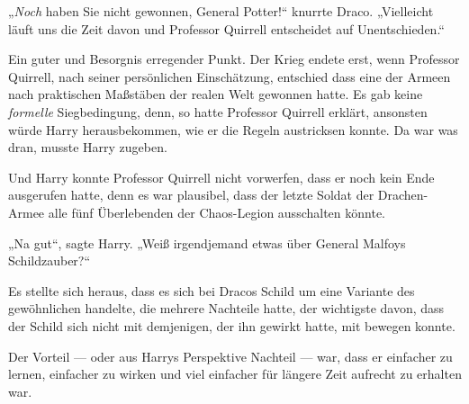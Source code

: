 „\emph{Noch} haben Sie nicht gewonnen, General Potter!“ knurrte Draco.
„Vielleicht läuft uns die Zeit davon und Professor Quirrell entscheidet auf Unentschieden.“

Ein guter und Besorgnis erregender Punkt. Der Krieg endete erst, wenn Professor Quirrell, nach seiner persönlichen Einschätzung, entschied dass eine der Armeen nach praktischen Maßstäben der realen Welt gewonnen hatte. Es gab keine \emph{formelle} Siegbedingung, denn, so hatte Professor Quirrell erklärt, ansonsten würde Harry herausbekommen, wie er die Regeln austricksen konnte. Da war was dran, musste Harry zugeben.

Und Harry konnte Professor Quirrell nicht vorwerfen, dass er noch kein Ende ausgerufen hatte, denn es war plausibel, dass der letzte Soldat der Drachen-Armee alle fünf Überlebenden der Chaos-Legion ausschalten könnte.

„Na gut“, sagte Harry.
„Weiß irgendjemand etwas über General Malfoys Schildzauber?“

Es stellte sich heraus, dass es sich bei Dracos Schild um eine Variante des gewöhnlichen  handelte, die mehrere Nachteile hatte, der wichtigste davon, dass der Schild sich nicht mit demjenigen, der ihn gewirkt hatte, mit bewegen konnte.

Der Vorteil — oder aus Harrys Perspektive Nachteil — war, dass er einfacher zu lernen, einfacher zu wirken und viel einfacher für längere Zeit aufrecht zu erhalten war.

